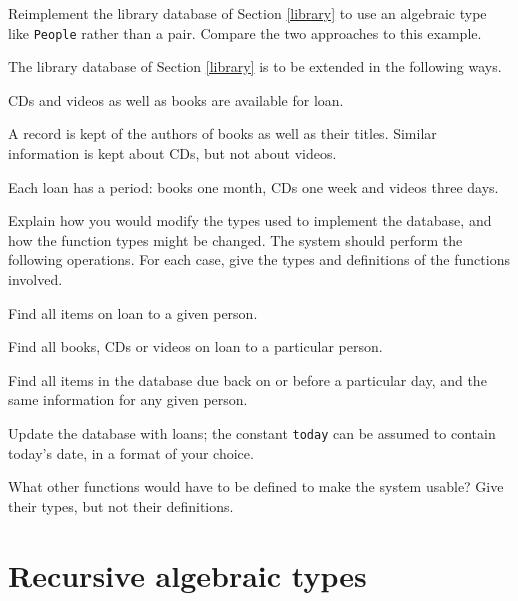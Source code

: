 \begin{exercises}





\item
Reimplement the library database
of Section \ref{library} to use an
algebraic type like \texttt{People} rather than a pair. Compare
the two approaches to this example.

\item
The library database of Section \ref{library} is to be extended in the
following ways.
\begin{titemize}
\item CDs and videos as well as books are available for loan.
\item A record is kept of the authors of books as well as their titles.
Similar information is kept about CDs, but not about videos.
\item Each loan has a period: books one month, CDs one week and videos three
days.
\end{titemize}
Explain how you would modify the types used to implement the database, and
how the function types might be changed. 
The system should perform the following operations. For each case, give the
types and definitions of the functions involved.
\begin{titemize}
\item Find all items on loan to a given person.
\item Find all books, CDs or videos on loan to a particular person.
\item Find all items in the database due back on or before a particular day,
and the same information for any given person.
\item Update the database with loans; the constant \texttt{today}
can be assumed to contain today's date, in a format of your
choice.
\end{titemize} 
What other functions would have to be defined to make the
system usable? Give their types, but not their definitions.
\end{exercises}



\section{Recursive algebraic types}
\label{recTypes}

